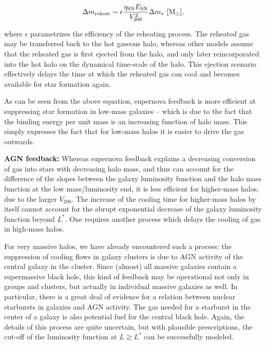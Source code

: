\documentclass[a4paper,10pt]{article}
\begin{document}
\begin{align*}
    \Delta m_\mathrm{reheat} \sim \epsilon\frac{\eta_\mathrm{SN}E_\mathrm{SN}}{V_{200}^2}\Delta m_* ~ [{\rm M_\odot}],
\end{align*}

{\noindent}where $\epsilon$ parametrizes the efficiency of the reheating process. The reheated gas may be transferred back to the hot gaseous halo, whereas other models assume that the reheated gas is first ejected from the halo, and only later reincorporated into the hot halo on the dynamical time-scale of the halo. This ejection scenario effectively delays the time at which the reheated gas can cool and becomes available for star formation again.

{\noindent}As can be seen from the above equation, supernova feedback is more efficient at suppressing star formation in low-mass galaxies -- which is due to the fact that the binding energy per unit mass is an increasing function of halo mass. This simply expresses the fact that for low-mass halos it is easier to drive the gas outwards.

{\noindent}\textbf{AGN feedback:} Whereas supernova feedback explains a decreasing conversion of gas into stars with decreasing halo mass, and thus can account for the difference of the slopes between the galaxy luminosity function and the halo mass function at the low mass/luminosity end, it is less efficient for higher-mass halos, due to the larger $V_{200}$. The increase of the cooling time for higher-mass halos by itself cannot account for the abrupt exponential decrease of the galaxy luminosity function beyond $L^*$. One requires another process which delays the cooling of gas in high-mass halos.

{\noindent}For very massive halos, we have already encountered such a process: the suppression of cooling flows in galaxy clusters is due to AGN activity of the central galaxy in the cluster. Since (almost) all massive galaxies contain a supermassive black hole, this kind of feedback may be operational not only in groups and clusters, but actually in individual massive galaxies as well. In particular, there is a great deal of evidence for a relation between nuclear starbursts in galaxies and AGN activity. The gas needed for a starburst in the center of a galaxy is also potential fuel for the central black hole. Again, the details of this process are quite uncertain, but with plausible prescriptions, the cut-off of the luminosity function at $L\gtrsim L^*$ can be successfully modeled.
\end{document}
